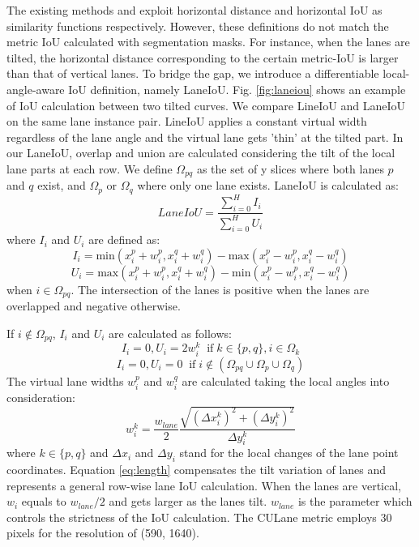 \documentclass[10pt,twocolumn,letterpaper]{article}
\begin{document}
The existing methods \cite{Liu_2021_ICCV} and \cite{Zheng_2022_CVPR} exploit horizontal distance and horizontal IoU as similarity functions respectively. However, these definitions do not match the metric IoU calculated with segmentation masks. 
For instance, when the lanes are tilted, the horizontal distance corresponding to the certain metric-IoU is larger than that of vertical lanes.
To bridge the gap, we introduce a differentiable local-angle-aware IoU definition, namely LaneIoU. 
Fig. \ref{fig:laneiou} shows an example of IoU calculation between two tilted curves. We compare LineIoU \cite{Zheng_2022_CVPR} and LaneIoU on the same lane instance pair. 
LineIoU applies a constant virtual width regardless of the lane angle and the virtual lane gets 'thin' at the tilted part.
In our LaneIoU, overlap and union are calculated considering the tilt of the local lane parts at each row. We define $\Omega_{pq}$ as the set of y slices where both lanes $p$ and $q$ exist, and $\Omega_{p}$ or $\Omega_{q}$ where only one lane exists. LaneIoU is calculated as:
\begin{equation}
\label{laneiou}
LaneIoU=\frac{\sum_{i=0}^H I_i }{\sum_{i=0}^H U_i}
\end{equation}
where $I_i$ and $U_i$ are defined as:
\begin{equation}
\label{laneiou}
I_i=\text{min}(x_i^p+w_i^p, x_i^q+w_i^q)-\text{max}(x_i^p-w_i^p, x_i^q-w_i^q)
\end{equation}
\begin{equation}
\label{laneiou}
U_i=\text{max}(x_i^p+w_i^p, x_i^q+w_i^q)-\text{min}(x_i^p-w_i^p, x_i^q-w_i^q)
\end{equation}
when $i \in\Omega_{pq}$. The intersection of the lanes is positive when the lanes are overlapped and negative otherwise.

\noindent If  $i \notin\Omega_{pq}$, $I_i$ and $U_i$ are calculated as follows:
\begin{equation}
I_i=0,   
U_i=2w_i^k \;\; \text{if} \; k\in\{p, q\}, i \in\Omega_{k}
\end{equation}
\begin{equation}
I_i=0,    
U_i=0 \;\; \text{if} \; i\notin(\Omega_{pq}\cup\Omega_{p}\cup\Omega_{q})
\end{equation}
The virtual lane widths $w_i^p$ and $w_i^q$ are calculated taking the local angles into consideration: 
\begin{equation}
\label{eq:length}
w_i^k = \frac{w_{lane}}{2}\frac{\sqrt{(\Delta x_i^k)^2 +  (\Delta y_i^k)^2}}{\Delta y_i^k}
\end{equation}
where $k\in\{p, q\}$ and $\Delta x_i$ and $\Delta y_i$ stand for the local changes of the lane point coordinates. Equation \ref{eq:length} compensates the tilt variation of lanes and represents a general row-wise lane IoU calculation. When  the lanes are vertical, $w_i$ equals to $w_{lane} / 2$ and gets larger as the lanes tilt. 
$w_{lane}$ is the parameter which controls the strictness of the IoU calculation.
The CULane metric employs 30 pixels for the resolution of (590, 1640).
\end{document}
